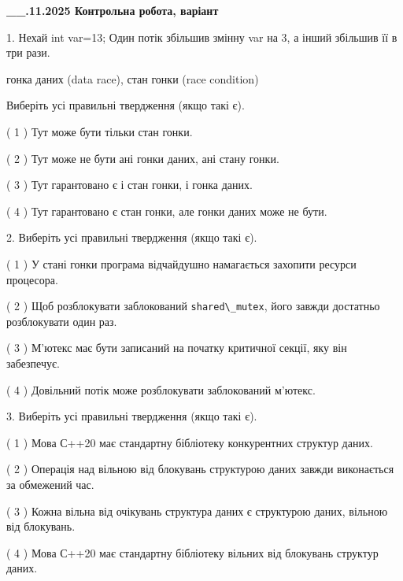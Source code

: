 \documentclass[12pt, ukrainian]{article}
\def\code#1{\Verb!#1!}
\begin{document}
\newpage
\begin {large}

\textbf{\_\_.11.2025 Контрольна робота, варіант  }\par


{
1. Нехай int var=13; Один потік збільшив змінну var на 3, а інший збільшив її в три рази.

гонка даних (data race), стан гонки (race condition)

Виберіть усі правильні твердження (якщо такі є).\par
\vspace{2mm}
( 1 ) Тут може бути тільки стан гонки.%

( 2 ) Тут може не бути ані гонки даних, ані стану гонки.%

( 3 ) Тут гарантовано є і стан гонки, і гонка даних.%

( 4 ) Тут гарантовано є стан гонки, але гонки даних може не бути.%


2. Виберіть усі правильні твердження (якщо такі є).\par
\vspace{2mm}

( 1 ) У стані гонки програма відчайдушно намагається захопити ресурси процесора.%

( 2 ) Щоб розблокувати заблокований \code{shared\_mutex}, його завжди достатньо розблокувати один раз.%

( 3 ) М’ютекс має бути записаний на початку критичної секції, яку він забезпечує.%

( 4 ) Довільний потік може розблокувати заблокований м’ютекс.%


3. Виберіть усі правильні твердження (якщо такі є).\par
\vspace{2mm}

( 1 ) Мова С++20 має стандартну бібліотеку конкурентних структур даних.%

( 2 ) Операція над вільною від блокувань структурою даних завжди виконається за обмежений час.%

( 3 ) Кожна вільна від очікувань структура даних є структурою даних, вільною від блокувань.%

( 4 ) Мова С++20 має стандартну бібліотеку вільних від блокувань структур даних.%


}
\end{large}
\end{document}
